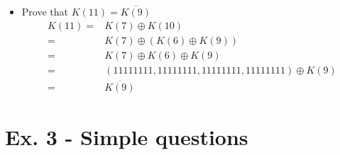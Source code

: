 \documentclass[11pt,a4paper]{article}
\begin{document}
\begin{enumerate}
\begin{itemize}
\item Prove that $K(11) = \overline{K(9)}$
\begin{align*}
	K(11) =& K(7) \oplus K(10) \\
	=& K(7) \oplus (K(6) \oplus K(9)) \\
	=& K(7) \oplus K(6) \oplus K(9) \\
	=& (11111111, 11111111, 11111111, 11111111) \oplus K(9) \\
	=& \overline{K(9)}
\end{align*}
\end{itemize}
\end{enumerate}


\newpage
\section*{Ex. 3 - Simple questions}
\end{document}
